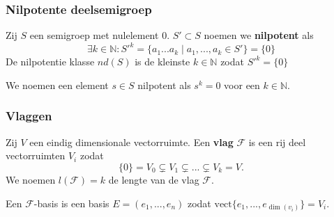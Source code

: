 \documentclass[12pt]{beamer}
\newcommand{\N}{\mathbb{N}}
\newcommand{\vect}{\mathrm{vect}}
\begin{document}
%
%
%


\begin{frame}
\frametitle{Nilpotente deelsemigroep}

\begin{block}{}
Zij $S$ een semigroep met nulelement $0$. $S' \subset S$ noemen we \textbf{nilpotent} als 
$$\exists k \in \N : S'^k = \{ a_1...a_k \; | \; a_1, ..., a_k \in S' \} = \{0 \} $$
De nilpotentie klasse $nd(S)$ is de kleinste $k \in \N$ zodat $S'^k = \{ 0\}$
\end{block}

\begin{block}{}
We noemen een element $s \in S$ nilpotent als $s^k = 0$ voor een $k \in \N$.
\end{block}

\end{frame}

\begin{frame}
\frametitle{Vlaggen}

\begin{block}{}
Zij $V$ een eindig dimensionale vectorruimte. Een \textbf{vlag} $\mathcal{F}$ is een rij deel vectorruimten $V_i$ zodat 
$$\{ 0 \} = V_0 \subsetneq V_1 \subsetneq ... \subsetneq V_k = V.$$ 
We noemen $l(\mathcal{F}) = k$ de lengte van de vlag $\mathcal{F}$.

\end{block}

\begin{block}{}
Een $\mathcal{F}$-basis is een basis $E = (e_1, ..., e_n)$ zodat $ \vect \{e_1, ..., e_{\dim(v_i)} \} = V_i$.
\end{block}

\end{frame}
\end{document}
